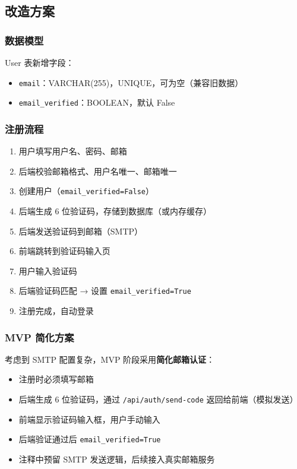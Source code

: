 \documentclass[11pt,a4paper]{article}
\begin{document}
\subsection{改造方案}

\subsubsection{数据模型}

User 表新增字段：
\begin{itemize}[nosep]
  \item \texttt{email}：VARCHAR(255)，UNIQUE，可为空（兼容旧数据）
  \item \texttt{email\_verified}：BOOLEAN，默认 False
\end{itemize}

\subsubsection{注册流程}

\begin{enumerate}[nosep]
  \item 用户填写用户名、密码、邮箱
  \item 后端校验邮箱格式、用户名唯一、邮箱唯一
  \item 创建用户（\texttt{email\_verified=False}）
  \item 后端生成 6 位验证码，存储到数据库（或内存缓存）
  \item 后端发送验证码到邮箱（SMTP）
  \item 前端跳转到验证码输入页
  \item 用户输入验证码
  \item 后端验证码匹配 → 设置 \texttt{email\_verified=True}
  \item 注册完成，自动登录
\end{enumerate}

\subsubsection{MVP 简化方案}

考虑到 SMTP 配置复杂，MVP 阶段采用\textbf{简化邮箱认证}：
\begin{itemize}[nosep]
  \item 注册时必须填写邮箱
  \item 后端生成 6 位验证码，通过 \texttt{/api/auth/send-code} 返回给前端（模拟发送）
  \item 前端显示验证码输入框，用户手动输入
  \item 后端验证通过后 \texttt{email\_verified=True}
  \item 注释中预留 SMTP 发送逻辑，后续接入真实邮箱服务
\end{itemize}
\end{document}

